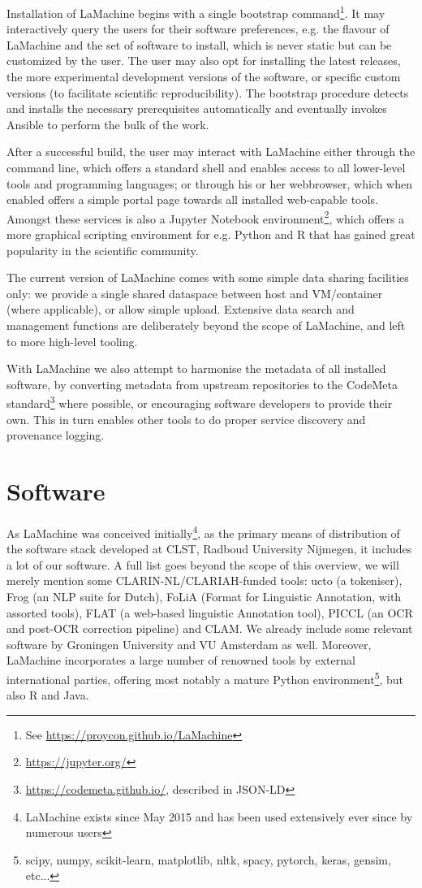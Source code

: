 \documentclass[a4paper,11pt]{article}
\begin{document}
Installation of LaMachine begins with a single bootstrap command\footnote{See
\url{https://proycon.github.io/LaMachine}}.  It may interactively query the users for their software preferences, e.g.
the flavour of LaMachine and the set of software to install, which is never static but can be customized by the user.
The user may also opt for installing the latest releases, the more experimental development versions of the software, or
specific custom versions (to facilitate scientific reproducibility). The bootstrap procedure detects and installs
the necessary prerequisites automatically and eventually invokes Ansible to perform the bulk of the work.

After a successful build, the user may interact with LaMachine either through the command line, which offers a standard
shell and enables access to all lower-level tools and programming languages; or through his or her webbrowser, which
when enabled offers a simple portal page towards all installed web-capable tools. Amongst these services is also a
Jupyter Notebook environment\footnote{\url{https://jupyter.org/}}, which offers a more graphical scripting environment
for e.g. Python and R that has gained great popularity in the scientific community.

The current version of LaMachine comes with some simple data sharing facilities only: we provide a
single shared dataspace between host and VM/container (where applicable), or allow simple upload. Extensive data
search and management functions are deliberately beyond the scope of LaMachine, and left to more high-level tooling.

With LaMachine we also attempt to harmonise the metadata of all installed software, by converting metadata from upstream repositories to
the CodeMeta standard\footnote{\url{https://codemeta.github.io/}, described in JSON-LD} \cite{codemeta,codemetar} where possible, or encouraging software developers to provide
their own. This in turn enables other tools to do proper service discovery and provenance logging.

\section{Software}

As LaMachine was conceived initially\footnote{LaMachine exists since May 2015 and has been used extensively ever since by
numerous users}, as the primary means of distribution of the software stack developed at CLST,
Radboud University Nijmegen, it includes a lot of our software. A full list goes beyond the scope of this overview, we
will merely mention some CLARIN-NL/CLARIAH-funded tools: ucto (a tokeniser), Frog (an NLP suite for Dutch), FoLiA (Format
for Linguistic Annotation, with assorted tools), FLAT (a web-based linguistic Annotation tool), PICCL (an OCR and
post-OCR correction pipeline) and CLAM. We already include some relevant software by Groningen University and VU
Amsterdam as well. Moreover, LaMachine incorporates a large number of renowned tools by external international parties,
offering most notably a mature Python environment\footnote{scipy, numpy, scikit-learn, matplotlib, nltk, spacy, pytorch,
keras, gensim, etc...}, but also R and Java.
\end{document}
